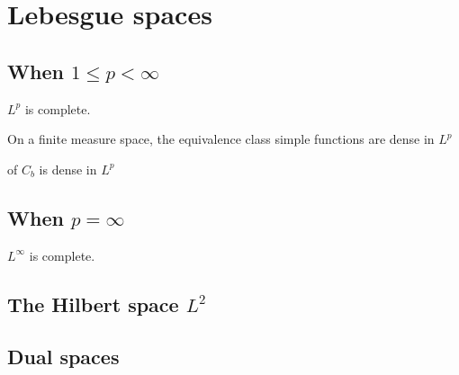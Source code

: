 \chapter{Lebesgue spaces} \label{chap:Leb-spaces}
    \section{When \texorpdfstring{$1 \leq p < \infty$}{1 <= p < infinity}} \label{sec:Lp-1-infty}
\begin{namedthm} \label{thm:Holder-ineq}

\end{namedthm}

\begin{namedthm} \label{thm:Minkowski-ineq}
    
\end{namedthm}

\begin{thm}
    $L^p$ is complete.
\end{thm}

\begin{prop}
    On a finite measure space, the equivalence class simple functions are dense in $L^p$
    
    of $C_b$ is dense in $L^p$
\end{prop}

\section{When \texorpdfstring{$p = \infty$}{p = infty}}
\begin{thm}
    $L^\infty$ is complete.
\end{thm}

\section{The Hilbert space \texorpdfstring{$L^2$}{L2}}

\section{Dual spaces}